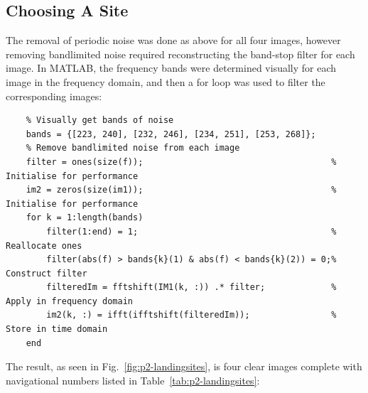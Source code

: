 \documentclass[12pt]{article}
\numberwithin{equation}{section}
\numberwithin{figure}{section}
\numberwithin{table}{section}
\begin{document}
\pagebreak
\subsection{Choosing A Site}
The removal of periodic noise was done as above for all four images, however
removing bandlimited noise required reconstructing the band-stop filter for
each image. In MATLAB, the frequency bands were determined visually for each
image in the frequency domain, and then a for loop was used to filter the
corresponding images:
\begin{verbatim}
    % Visually get bands of noise
    bands = {[223, 240], [232, 246], [234, 251], [253, 268]};
    % Remove bandlimited noise from each image
    filter = ones(size(f));                                     % Initialise for performance
    im2 = zeros(size(im1));                                     % Initialise for performance
    for k = 1:length(bands)
        filter(1:end) = 1;                                      % Reallocate ones
        filter(abs(f) > bands{k}(1) & abs(f) < bands{k}(2)) = 0;% Construct filter
        filteredIm = fftshift(IM1(k, :)) .* filter;             % Apply in frequency domain
        im2(k, :) = ifft(ifftshift(filteredIm));                % Store in time domain
    end
\end{verbatim}

The result, as seen in Fig.~\ref{fig:p2-landingsites}, is four clear images
complete with navigational numbers listed in Table~\ref{tab:p2-landingsites}:
\end{document}
